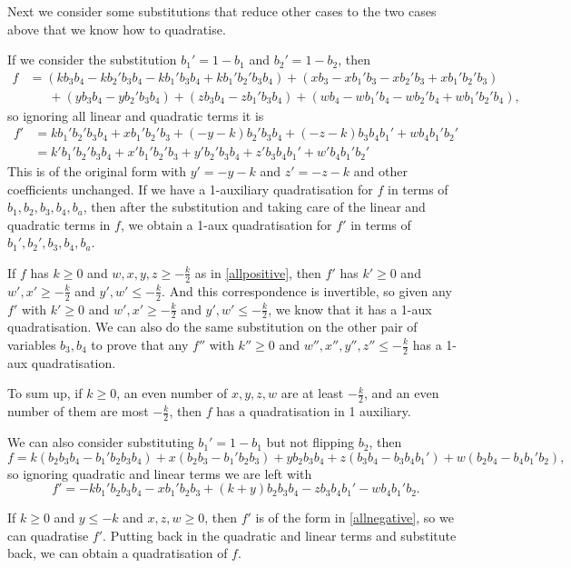 \documentclass[11pt]{scrartcl}
\begin{document}
Next we consider some substitutions that reduce other cases to the two cases above that we know how to quadratise.

If we consider the substitution $b_1' = 1-b_1$ and $b_2' = 1-b_2$, then
\begin{align*} 
	f &= (kb_3b_4 - kb_2'b_3b_4 -kb_1'b_3b_4 + kb_1'b_2'b_3b_4) + (xb_3 - xb_1'b_3 - xb_2'b_3 +  xb_1'b_2'b_3)  \\ 
	&\phantom{=}\ + (yb_3b_4 - yb_2'b_3b_4) + (zb_3b_4 - zb_1'b_3b_4) + (wb_4 - wb_1'b_4 - wb_2'b_4 + wb_1'b_2'b_4),\end{align*}
so ignoring all linear and quadratic terms it is
\begin{align*} f' &= kb_1'b_2'b_3b_4 + xb_1'b_2'b_3 + (-y-k)b_2'b_3b_4 + (-z-k)b_3b_4b_1' + wb_4b_1'b_2'\\ 
	&=k'b_1'b_2'b_3b_4 + x'b_1'b_2'b_3 + y'b_2'b_3b_4 + z'b_3b_4b_1' + w'b_4b_1'b_2'
\end{align*}
This is of the original form with $y'=-y-k$ and $z'=-z-k$ and other coefficients unchanged. 
If we have a 1-auxiliary quadratisation for $f$ in terms of $b_1, b_2, b_3, b_4, b_a$, 
then after the substitution and taking care of the linear and quadratic terms in $f$, we obtain a 1-aux quadratisation for $f'$ in terms of $b_1', b_2', b_3, b_4, b_a$.

If $f$ has $k \ge 0$ and $w, x, y , z \ge -\frac{k}{2}$ as in \ref{allpositive}, then $f'$ has $k' \ge 0$ and $w', x' \ge -\frac{k}{2}$ and $y', w' \le -\frac{k}{2}$. And this correspondence is invertible, so given any $f'$ with  $k' \ge 0$ and $w', x' \ge -\frac{k}{2}$ and $y', w' \le -\frac{k}{2}$,
we know that it has a 1-aux quadratisation. We can also do the same substitution on the other pair of variables $b_3, b_4$ to prove that any $f''$ with $k'' \ge 0$ and $w'', x'', y'', z'' \le -\frac{k}{2}$ has a 1-aux quadratisation. 

To sum up, if $k\ge 0$, an even number of $x, y, z, w$ are at least $-\frac{k}{2}$, and an even number of them are most $-\frac{k}{2}$, then $f$ has a quadratisation in 1 auxiliary.

We can also consider substituting $b_1' = 1-b_1$ but not flipping $b_2$, then 
\[ f = k(b_2b_3b_4 - b_1'b_2b_3b_4) + x(b_2b_3 - b_1'b_2b_3) + yb_2 b_3 b_4 + z (b_3b_4 - b_3b_4b_1') + w(b_2b_4 - b_4b_1'b_2), \]
so ignoring quadratic and linear terms we are left with 
\[ f' = -k b_1'b_2b_3b_4 -xb_1'b_2b_3 + (k+y)b_2b_3b_4 -zb_3b_4b_1' -w b_4 b_1' b_2 .\]

If $k \ge 0$ and $y \le -k$ and $x, z, w \ge 0$, then $f'$ is of the form in \ref{allnegative}, so we can quadratise $f'$. Putting back in the quadratic and linear terms and substitute back, we can obtain a quadratisation of $f$.
 
\end{document}
